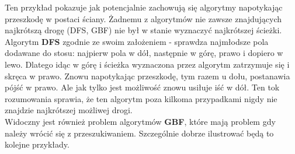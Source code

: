 \documentclass{article}
\begin{document}
Ten przykład pokazuje jak potencjalnie zachowują się algorytmy napotykając przeszkodę w postaci ściany. Żadnemu z algorytmów nie zawsze znajdujących najkrótszą drogę (DFS, GBF) nie był w stanie wyznaczyć najkrótszej ścieżki. Algorytm \textbf{DFS} zgodnie ze swoim założeniem - sprawdza najmłodsze pola dodawane do stosu: najpierw pola w dół, następnie w górę, prawo i dopiero w lewo. Dlatego idąc w górę i ścieżka wyznaczona przez algorytm zatrzymuje się i skręca w prawo. Znowu napotykając przeszkodę, tym razem u dołu, postanawia pójść w prawo. Ale jak tylko jest możliwość znowu usiłuje iść w dół. Ten tok rozumowania sprawia, że ten algorytm poza kilkoma przypadkami nigdy nie znajdzie najkrótszej możliwej drogi. \\
Widoczny jest również problem algorytmów \textbf{GBF}, które mają problem gdy należy wrócić się z przeszukiwaniem. Szczególnie dobrze ilustrować będą to kolejne przykłady.\\
\end{document}

